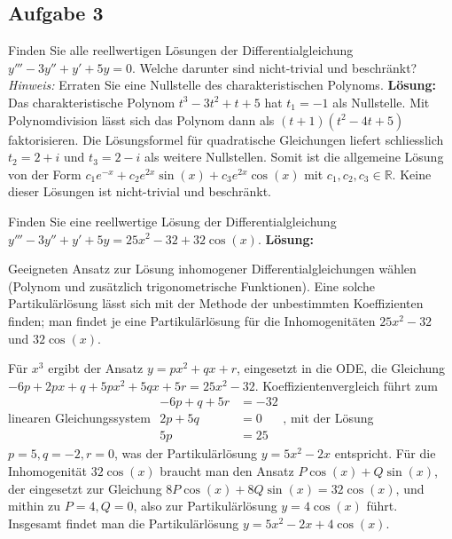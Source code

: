 \documentclass[a4paper,10pt]{article}
\def\R{\mathbb{R}}
\begin{document}
\subsection{Aufgabe 3}

Finden Sie alle reellwertigen Lösungen der Differentialgleichung
\(
    y''' - 3y'' + y' + 5y = 0 \text{.}
\)
Welche darunter sind nicht-trivial und beschränkt?
\textit{Hinweis:} Erraten Sie eine Nullstelle des charakteristischen Polynoms.
\textbf{Lösung:} Das charakteristische Polynom \( t^3 - 3t^2 + t + 5 \) hat \( t_1 = -1 \) als Nullstelle. Mit Polynomdivision lässt sich das Polynom dann als \( (t + 1)(t^2 - 4t + 5) \) faktorisieren. Die Lösungsformel für quadratische Gleichungen liefert schliesslich \( t_2 = 2 + i \) und \( t_3 = 2 - i \) als weitere Nullstellen. Somit ist die allgemeine Lösung von der Form
\(
    c_1 e^{-x} + c_2 e^{2x} \sin(x) + c_3 e^{2x} \cos(x)
\)
mit \( c_1, c_2, c_3 \in \R \). Keine dieser Lösungen ist nicht-trivial und beschränkt.

Finden Sie eine reellwertige Lösung der Differentialgleichung
\(
    y''' - 3y'' + y' +5y = 25x^2 - 32 + 32 \cos(x) \text{.}
\)
\textbf{Lösung:}
\begin{enumerate*}
    \item Geeigneten Ansatz zur Lösung inhomogener Differentialgleichungen wählen (Polynom und zusätzlich trigonometrische Funktionen).
    Eine solche Partikulärlösung lässt sich mit der Methode der unbestimmten Koeffizienten finden; man findet je eine Partikulärlösung für die Inhomogenitäten \( 25x^2 - 32 \) und \( 32 \cos(x) \).
    \item Für \( x^3 \) ergibt der Ansatz \( y = px^2 + qx + r \), eingesetzt in die ODE, die Gleichung
    \(
        -6p + 2px + q + 5px^2  + 5qx + 5r = 25x^2 - 32 \text{.}
    \)
    Koeffizientenvergleich führt zum linearen Gleichungssystem
    \(
        \begin{aligned}
            -6p + q + 5r &= -32 \\
            2p + 5q &= 0 \\
            5p &= 25
        \end{aligned} \text{,}
    \)
    mit der Lösung \( p = 5, q = -2, r = 0 \), was der Partikulärlösung \( y = 5x^2 - 2x \) entspricht.
    Für die Inhomogenität \( 32 \cos(x) \) braucht man den Ansatz \( P \cos(x) + Q \sin(x) \), der eingesetzt zur Gleichung
    \(
        8P \cos(x) + 8Q \sin(x) = 32 \cos(x) \text{,}
    \)
    und mithin zu \( P = 4, Q = 0 \), also zur Partikulärlösung \( y = 4 \cos(x) \) führt.
    Insgesamt findet man die Partikulärlösung \( y = 5x^2 - 2x + 4 \cos(x) \).
\end{enumerate*}
\end{document}
